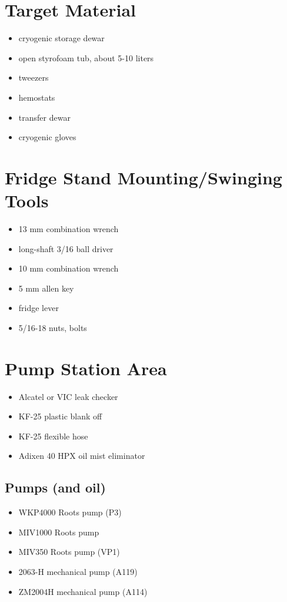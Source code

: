 \section{Target Material}
\begin{itemize}
 \item cryogenic storage \lnn{} dewar
\item open styrofoam tub, about 5-10 liters
\item tweezers
\item hemostats
\item \lnn{} transfer dewar
\item cryogenic gloves
\end{itemize}

\section{Fridge Stand Mounting/Swinging Tools}

\begin{itemize}
  \item 13 mm combination wrench
  \item long-shaft 3/16\inches{} ball driver
  \item 10 mm combination wrench
  \item 5 mm allen key
  \item fridge lever
  \item {} 5/16\inches{}-18 nuts, bolts
\end{itemize}


\section{Pump Station Area}
  \begin{itemize}
   \item Alcatel or VIC leak checker
   \item KF-25 plastic blank off
   \item KF-25 flexible hose
   \item Adixen 40 HPX oil mist eliminator 
  \end{itemize}

  \subsection{\het{} Pumps (and oil)} %
\begin{itemize}
 \item {} WKP4000 Roots pump (P3)
 \item {} MIV1000 Roots pump
 \item {} MIV350 Roots pump (VP1)
 \item {} 2063-H mechanical pump (A119)
 \item {} ZM2004H mechanical pump (A114)
\end{itemize}

